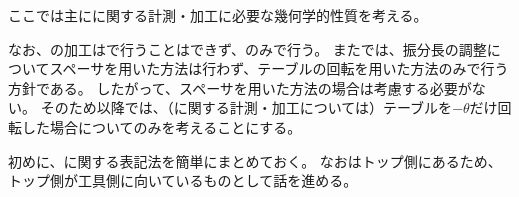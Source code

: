 


ここでは主に\expandafterindex{\dimplekana@\dimple}\textbf{\dimple}に関する計測・加工に必要な幾何学的性質を考える。

なお、\dimple の加工は\MMname で行うことはできず、\DMname のみで行う。
また\DMname では、振分長の調整についてスペーサを用いた方法は行わず、テーブルの回転を用いた方法のみで行う方針である。
したがって、スペーサを用いた方法の場合は考慮する必要がない。
そのため以降では、（\dimple に関する計測・加工については）テーブルを$-\theta$だけ回転した場合についてのみを考えることにする。




初めに、\dimple に関する表記法を簡単にまとめておく。
なお\dimple はトップ側にあるため、トップ側が工具側に向いているものとして話を進める。

